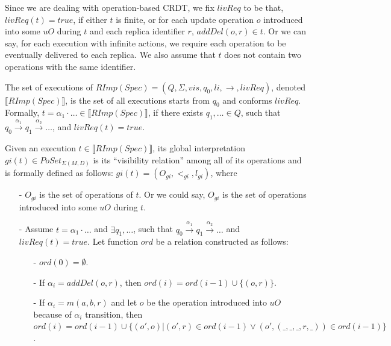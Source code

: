 {\begin{itemize}
    Since we are dealing with operation-based CRDT, we fix $livReq$ to be that, $livReq(t) = \textit{true}$, if either $t$ is finite, {\color {red}or for each update operation $o$ introduced into some $uO$ during $t$ and each replica identifier $r$, $addDel(o,r) \in t$.} Or we can say, for each execution with infinite actions, we require each operation to be eventually delivered to each replica. We also assume that $t$ does not contain two operations with the same identifier.
\end{itemize}

The set of executions of $RImp(Spec) = (Q,\Sigma,vis,q_0,li,\rightarrow,livReq)$, denoted $\llbracket RImp(Spec) \rrbracket$, is the set of all executions starts from $q_0$ and conforms $livReq$. Formally, $t = \alpha_1 \cdot \ldots \in \llbracket RImp(Spec) \rrbracket$, if there exists $q_1,\ldots \in Q$, such that $q_0 {\xrightarrow{\alpha_1}} q_1 {\xrightarrow{\alpha_2}} \ldots$, and $livReq(t) = \textit{true}$.

Given an execution $t \in \llbracket RImp(Spec) \rrbracket$, its global interpretation $gi(t) \in PoSet_{\Sigma(M,D)}$ is its ``visibility relation'' among all of its operations and is formally defined as follows: $gi(t) = (O_{gi},<_{gi},l_{gi})$, where

\begin{itemize}
\setlength{\itemsep}{0.5pt}
\item[-] $O_{gi}$ is the set of operations of $t$. Or we could say, $O_{gi}$ is the set of operations introduced into some $uO$ during $t$.

\item[-] Assume $t = \alpha_1 \cdot \ldots$ and $\exists q_1,\ldots$, such that $q_0 {\xrightarrow{\alpha_1}} q_1 {\xrightarrow{\alpha_2}} \ldots$ and $livReq(t) = \textit{true}$. Let function $ord$ be a relation constructed as follows:

    \begin{itemize}
    \setlength{\itemsep}{0.5pt}
    \item[-] $ord(0) = \emptyset$.

    \item[-] If $\alpha_i = addDel(o,r)$, then $ord(i) = ord(i-1) \cup \{ (o,r) \}$.

    \item[-] If $\alpha_i = m(a,b,r)$ and let $o$ be the operation introduced into $uO$ because of $\alpha_i$ transition, then $ord(i) = ord(i-1) \cup \{ (o',o) \vert (o',r) \in ord(i-1) \vee (o',(\_,\_,\_,r,\_)) \in ord(i-1) \}$.
    \end{itemize}


\end{itemize}}
